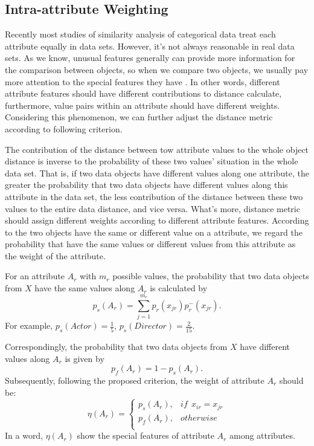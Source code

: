 \documentclass[review]{elsarticle}
\begin{document}
\subsection{Intra-attribute Weighting}
Recently most studies of similarity analysis of categorical data treat each attribute equally in data sets. However, it's not always reasonable in real data sets. As we know, unusual features generally can provide more information for the comparison between objects, so when we compare two objects, we usually pay more attention to the special features they have \cite{JiaH2016NewMetric}. In other words, different attribute features should have different contributions to distance calculate, furthermore, value pairs within an attribute should have different weights. Considering this phenomenon, we can further adjust the distance metric according to following criterion.

The contribution of the distance between tow attribute values to the whole object distance is inverse to the probability of these two values' situation in the whole data set. That is, if two data objects have different values along one attribute, the greater the probability that two data objects have different values along this attribute in the data set, the less contribution of the distance between these two values to the entire data distance, and vice versa. What's more, distance metric should assign different weights according to different attribute features. According to the two objects have the same or different value on a attribute, we regard the probability that have the same values or different values from this attribute as the weight of the attribute.

For an attribute $A_r$ with $m_r$ possible values, the probability that two data objects from $X$ have the same values along $A_r$ is calculated by
\begin{equation}
p_s(A_r) = \sum_{j=1}^{m_r}p_r(x_{jr})p_r^-(x_{jr}).
\label{equ5}
\end{equation}
For example, $p_s(Actor) = \frac{1}{5}$, $p_s(Director) = \frac{2}{15}$.

Correspondingly, the probability that two data objects from $X$ have different values along $A_r$ is given by
\begin{equation}
p_f(A_r) = 1 - p_s(A_r).
\label{equ6}
\end{equation}
Subsequently, following the proposed criterion, the weight of attribute $A_r$ should be:
\begin{equation}
\label{equ7}
\eta(A_r)=
\left\{\begin{array}{cc}
  p_s(A_r), & if\ \ x_{ir} = x_{jr} \\
  p_f(A_r), & otherwise \\
  \end{array} \right.
\end{equation}
In a word, $\eta(A_r)$ show the special features of attribute $A_r$ among attributes.
\end{document}
